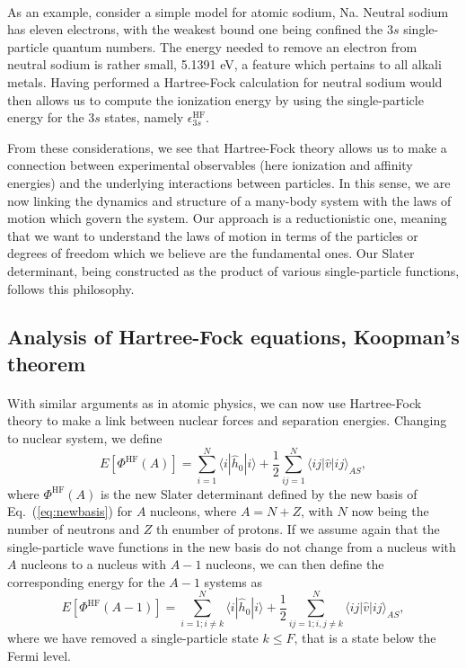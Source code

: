 \documentclass[%
twoside,                 %
final,                   %
10pt]{article}
\begin{document}
\paragraph{}
As an example, consider a simple model for atomic sodium, Na. Neutral sodium has eleven electrons, 
with the weakest bound one being confined the $3s$ single-particle quantum numbers. The energy needed to remove an electron from neutral sodium is rather small, 5.1391 eV, a feature which pertains to all alkali metals.
Having performed a  Hartree-Fock calculation for neutral sodium would then allows us to compute the
ionization energy by using the single-particle energy for the $3s$ states, namely $\epsilon_{3s}^{\mathrm{HF}}$. 

From these considerations, we see that Hartree-Fock theory allows us to make a connection between experimental 
observables (here ionization and affinity energies) and the underlying interactions between particles.  
In this sense, we are now linking the dynamics and structure of a many-body system with the laws of motion which govern the system. Our approach is a reductionistic one, meaning that we want to understand the laws of motion 
in terms of the particles or degrees of freedom which we believe are the fundamental ones. Our Slater determinant, being constructed as the product of various single-particle functions, follows this philosophy.



\subsection{Analysis of Hartree-Fock equations, Koopman's theorem}

\paragraph{}
With similar arguments as in atomic physics, we can now use Hartree-Fock theory to make a link
between nuclear forces and separation energies. Changing to nuclear system, we define
\[
  E[\Phi^{\mathrm{HF}}(A)] 
  = \sum_{i=1}^N \langle i | \hat{h}_0 | i \rangle +
  \frac{1}{2}\sum_{ij=1}^N\langle ij|\hat{v}|ij\rangle_{AS},
\]
where $\Phi^{\mathrm{HF}}(A)$ is the new Slater determinant defined by the new basis of Eq.~(\ref{eq:newbasis})
for $A$ nucleons, where $A=N+Z$, with $N$ now being the number of neutrons and $Z$ th enumber of protons.  If we assume again that the single-particle wave functions in the new basis do not change from a nucleus with $A$ nucleons to a nucleus with $A-1$  nucleons, we can then define the corresponding energy for the $A-1$ systems as 
\[
  E[\Phi^{\mathrm{HF}}(A-1)] 
  = \sum_{i=1; i\ne k}^N \langle i | \hat{h}_0 | i \rangle +
  \frac{1}{2}\sum_{ij=1;i,j\ne k}^N\langle ij|\hat{v}|ij\rangle_{AS},
\]
where we have removed a single-particle state $k\le F$, that is a state below the Fermi level.
\end{document}
